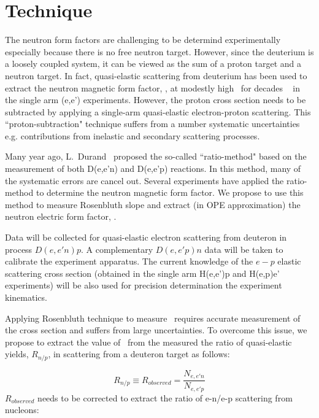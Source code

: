\section{Technique}
%
The neutron form factors are challenging to be determind experimentally especially because there is no free neutron target. 
However, since the deuterium is a loosely coupled system, it can be viewed as the sum of a proton target and a neutron target. 
In fact, quasi-elastic scattering from deuterium has been used to extract the neutron magnetic form factor, \gmn, at modestly high \qsq~for decades
~\cite{Hughes:1965zza, Arnold:1988us} in the single arm (e,e') experiments. 
However, the proton cross section needs to be subtracted by applying a single-arm quasi-elastic electron-proton scattering. 
This ``proton-subtraction" technique suffers from a number systematic uncertainties e.g. contributions from inelastic and secondary scattering processes. 

Many year ago, L.~Durand~\cite{Durand:1959zz} proposed the so-called ``ratio-method" based on the measurement of both D(e,e'n) and D(e,e'p) reactions. 
In this method, many of the systematic errors are cancel out. 
Several experiments \cite{Bruins:1995ns, Kubon:2001rj, Lachniet:2008qf} have applied the ratio-method to determine the neutron magnetic form factor. 
We propose to use this method to measure Rosenbluth slope and extract (in OPE approximation) the neutron electric form factor, \gen.

Data will be collected for quasi-elastic electron scattering from deuteron in process $D(e,e'n)p$. 
A complementary $D(e,e'p)n$ data will be taken to calibrate the experiment apparatus.
The current knowledge of the $e-p$ elastic scattering cross section (obtained in the single arm H(e,e')p and H(e,p)e' experiments) will be also used
for precision determination the experiment kinematics.

Applying Rosenbluth technique to measure \gen~requires accurate measurement of the cross section  and suffers from large uncertainties. 
To overcome this issue, we propose to extract the value of \gen~from the measured the ratio of quasi-elastic yields, $R_{n/p}$, in scattering from a deuteron target as follows: 

\begin{equation}
R_{n/p} \equiv R_{observed} = \frac{N_{e,e'n}}{N_{e,e'p}}
\label{eq:1}
\end{equation}
$R_{observed}$ needs to be corrected to extract the ratio of e-n/e-p scattering from nucleons:


